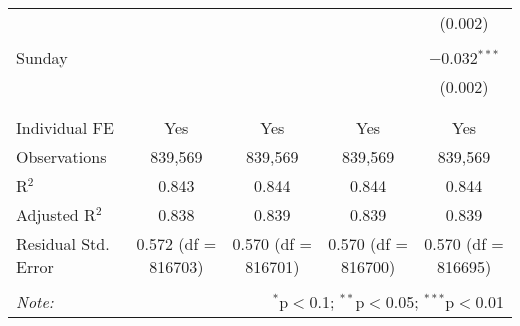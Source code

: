 \documentclass[
]{article}
\begin{document}
\begin{table}[!htbp]
{\begin{tabular}{@{\extracolsep{5pt}}lcccc}
  &  &  &  & (0.002) \\ 
  & & & & \\ 
 Sunday &  &  &  & $-$0.032$^{***}$ \\ 
  &  &  &  & (0.002) \\ 
  & & & & \\ 
\hline \\[-1.8ex] 
Individual FE & Yes & Yes & Yes & Yes \\ 
Observations & 839,569 & 839,569 & 839,569 & 839,569 \\ 
R$^{2}$ & 0.843 & 0.844 & 0.844 & 0.844 \\ 
Adjusted R$^{2}$ & 0.838 & 0.839 & 0.839 & 0.839 \\ 
Residual Std. Error & 0.572 (df = 816703) & 0.570 (df = 816701) & 0.570 (df = 816700) & 0.570 (df = 816695) \\ 
\hline 
\hline \\[-1.8ex] 
\textit{Note:}  & \multicolumn{4}{r}{$^{*}$p$<$0.1; $^{**}$p$<$0.05; $^{***}$p$<$0.01} \\ 
\end{tabular}
} 
\end{table} 
\newpage
\end{document}
